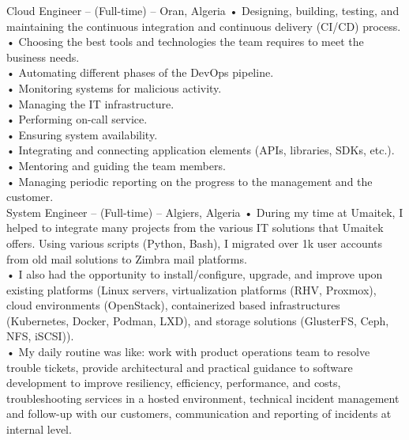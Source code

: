 \documentclass{cv}
\begin{document}
{Cloud Engineer -- (Full-time)}
{\lab -- Oran, Algeria\vspace{.3cm}}
{
  • Designing, building, testing, and maintaining the continuous integration and continuous delivery (CI/CD) process.\\
  • Choosing the best tools and technologies the team requires to meet the business needs.\\
  • Automating different phases of the DevOps pipeline.\\
  • Monitoring systems for malicious activity.\\
  • Managing the IT infrastructure.\\
  • Performing on-call service.\\
  • Ensuring system availability.\\
  • Integrating and connecting application elements (APIs, libraries, SDKs, etc.).\\
  • Mentoring and guiding the team members.\\ 
  • Managing periodic reporting on the progress to the management and the customer.\\
}
{System Engineer -- (Full-time)}
{\umtk -- Algiers, Algeria\vspace{.3cm}}
{
  • During my time at Umaitek, I helped to integrate many projects from the various IT solutions that Umaitek offers.
    Using various scripts (Python, Bash), I migrated over 1k user accounts from old mail solutions to Zimbra mail platforms.\\
  • I also had the opportunity to install/configure, upgrade, and improve upon existing platforms (Linux servers, virtualization platforms (RHV, Proxmox), 
    cloud environments (OpenStack), containerized based infrastructures (Kubernetes, Docker, Podman, LXD), and storage solutions (GlusterFS, Ceph, NFS, iSCSI)).\\
  • My daily routine was like: work with product operations team to resolve trouble tickets, provide architectural and practical guidance to software development to improve resiliency, efficiency, performance, and costs, troubleshooting services in a hosted environment, technical incident management and follow-up with our customers,
  communication and reporting of incidents at internal level.\\

}
\\
\end{document}
